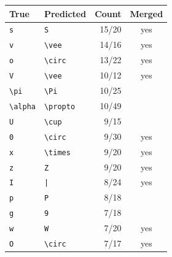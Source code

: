 \begin{tabular}{llrc}
\toprule
True & Predicted & Count & Merged \\
\midrule
\texttt{s} & \texttt{S} & 15/20 & yes \\
\texttt{v} & \texttt{\textbackslash{}vee} & 14/16 & yes \\
\texttt{o} & \texttt{\textbackslash{}circ} & 13/22 & yes \\
\texttt{V} & \texttt{\textbackslash{}vee} & 10/12 & yes \\
\texttt{\textbackslash{}pi} & \texttt{\textbackslash{}Pi} & 10/25 &  \\
\texttt{\textbackslash{}alpha} & \texttt{\textbackslash{}propto} & 10/49 &  \\
\texttt{U} & \texttt{\textbackslash{}cup} & 9/15 &  \\
\texttt{0} & \texttt{\textbackslash{}circ} & 9/30 & yes \\
\texttt{x} & \texttt{\textbackslash{}times} & 9/20 & yes \\
\texttt{z} & \texttt{Z} & 9/20 & yes \\
\texttt{I} & \texttt{|} & 8/24 & yes \\
\texttt{p} & \texttt{P} & 8/18 &  \\
\texttt{g} & \texttt{9} & 7/18 &  \\
\texttt{w} & \texttt{W} & 7/20 & yes \\
\texttt{O} & \texttt{\textbackslash{}circ} & 7/17 & yes \\
\bottomrule
\end{tabular}
